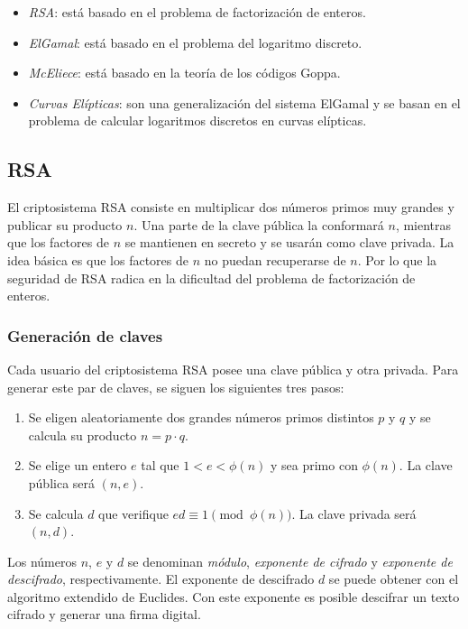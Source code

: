 \begin{itemize}
    \item \emph{RSA}: está basado en el problema de factorización de enteros.
    \item \emph{ElGamal}: está basado en el problema del logaritmo discreto.
    \item \emph{McEliece}: está basado en la teoría de los códigos Goppa.
    \item \emph{Curvas Elípticas}: son una generalización del sistema ElGamal y se basan en el problema de calcular logaritmos discretos en curvas elípticas.
\end{itemize}

\subsection{RSA}

El criptosistema RSA consiste en multiplicar dos números primos muy grandes y publicar su producto $n$. Una parte de la clave pública la conformará $n$, mientras que los factores de $n$ se mantienen en secreto y se usarán como clave privada. La idea básica es que los factores de $n$ no puedan recuperarse de $n$. Por lo que la seguridad de RSA radica en la dificultad del problema de factorización de enteros.

\subsubsection{Generación de claves}

Cada usuario del criptosistema RSA posee una clave pública y otra privada. Para generar este par de claves, se siguen los siguientes tres pasos:

\begin{enumerate}
    \item Se eligen aleatoriamente dos grandes números primos distintos $p$ y $q$ y se calcula su producto $n = p \cdot q$.
    \item Se elige un entero $e$ tal que $1 < e < \phi(n)$ y sea primo con $\phi(n)$. La clave pública será $(n, e)$.
    \item Se calcula $d$ que verifique $ed \equiv 1 \pmod{\phi(n)}$. La clave privada será $(n, d)$.
\end{enumerate}

Los números $n$, $e$ y $d$ se denominan \emph{módulo}, \emph{exponente de cifrado} y \emph{exponente de descifrado}, respectivamente. El exponente de descifrado $d$ se puede obtener con el algoritmo extendido de Euclides. Con este exponente es posible descifrar un texto cifrado y generar una firma digital.

